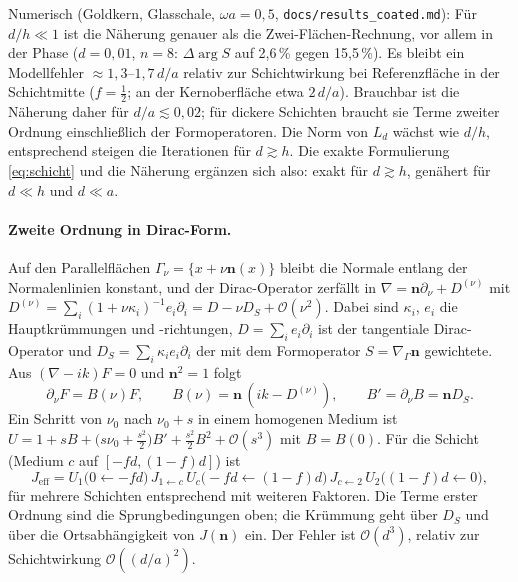 \documentclass[11pt, a4paper]{article}
\newcommand{\mvec}[1]{\boldsymbol{#1}}
\newcommand{\n}{\mvec{n}}
\theoremstyle{plain}
\theoremstyle{definition}
\begin{document}
Numerisch (Goldkern, Glasschale, $\omega a=0{,}5$, \texttt{docs/results\_coated.md}): Für $d/h\ll1$ ist die Näherung
genauer als die Zwei-Flächen-Rechnung, vor allem in der Phase ($d=0{,}01$, $n=8$: $\Delta\arg S$ auf 2,6\,\% gegen
15,5\,\%). Es bleibt ein Modellfehler $\approx1{,}3$--$1{,}7\,d/a$ relativ zur Schichtwirkung bei Referenzfläche in der
Schichtmitte ($f=\tfrac12$; an der Kernoberfläche etwa $2\,d/a$). Brauchbar ist die Näherung daher für
$d/a\lesssim0{,}02$; für dickere Schichten braucht sie Terme zweiter Ordnung einschließlich der Formoperatoren. Die
Norm von $L_d$ wächst wie $d/h$, entsprechend steigen die Iterationen für $d\gtrsim h$. Die exakte Formulierung
\eqref{eq:schicht} und die Näherung ergänzen sich also: exakt für $d\gtrsim h$, genähert für $d\ll h$ und $d\ll a$.

\paragraph{Zweite Ordnung in Dirac-Form.} Auf den Parallelflächen $\Gamma_\nu=\{x+\nu\n(x)\}$ bleibt die Normale entlang
der Normalenlinien konstant, und der Dirac-Operator zerfällt in $\nabla=\n\partial_\nu+D^{(\nu)}$ mit
$D^{(\nu)}=\sum_i(1+\nu\kappa_i)^{-1}e_i\partial_i=D-\nu D_S+\mathcal{O}(\nu^2)$. Dabei sind $\kappa_i$, $e_i$ die
Hauptkrümmungen und -richtungen, $D=\sum_ie_i\partial_i$ ist der tangentiale Dirac-Operator und
$D_S=\sum_i\kappa_ie_i\partial_i$ der mit dem Formoperator $S=\nabla_\Gamma\n$ gewichtete. Aus $(\nabla-ik)F=0$ und
$\n^2=1$ folgt
\[
  \partial_\nu F=B(\nu)F,\qquad B(\nu)=\n\,(ik-D^{(\nu)}),\qquad B'=\partial_\nu B=\n D_S .
\]
Ein Schritt von $\nu_0$ nach $\nu_0+s$ in einem homogenen Medium ist
$U=1+sB+\big(s\nu_0+\tfrac{s^2}{2}\big)B'+\tfrac{s^2}{2}B^2+\mathcal{O}(s^3)$ mit $B=B(0)$. Für die Schicht (Medium $c$
auf $[-fd,(1-f)d]$) ist
\[
  J_{\mathrm{eff}}=U_1\big(0\leftarrow-fd\big)\,J_{1\leftarrow c}\,U_c\big(-fd\leftarrow(1-f)d\big)\,J_{c\leftarrow2}\,
    U_2\big((1-f)d\leftarrow0\big),
\]
für mehrere Schichten entsprechend mit weiteren Faktoren. Die Terme erster Ordnung sind die Sprungbedingungen oben;
die Krümmung geht über $D_S$ und über die Ortsabhängigkeit von $J(\n)$ ein. Der Fehler ist $\mathcal{O}(d^3)$, relativ zur
Schichtwirkung $\mathcal{O}((d/a)^2)$.
\end{document}
